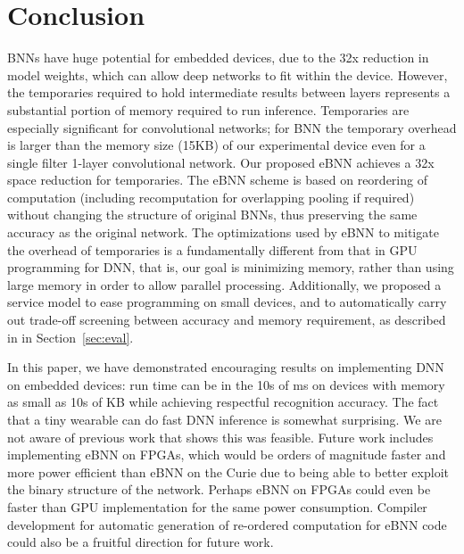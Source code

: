 \documentclass[10pt,emptycopyrightspace]{ewsn-proc}
\begin{document}



\section{Conclusion}
\label{sec:conclusion}
BNNs have huge potential for embedded devices, due to the 32x reduction in model weights, which can allow deep networks to fit within the device. However, the temporaries required to hold intermediate results between layers represents a substantial portion of memory required to run inference. Temporaries are especially significant for convolutional networks; for BNN the temporary overhead is larger than the memory size (15KB) of our experimental device even for a single filter 1-layer convolutional network. Our proposed eBNN achieves a 32x space reduction for temporaries. The eBNN scheme is based on reordering of computation (including recomputation for overlapping pooling if required) without changing the structure of original BNNs, thus preserving the same accuracy as the original network. The optimizations used by eBNN to mitigate the overhead of temporaries is a fundamentally different from that in GPU programming for DNN, that is, our goal is minimizing memory, rather than using large memory in order to allow parallel processing. Additionally, we proposed a service model to ease programming on small devices, and to automatically carry out trade-off screening between accuracy and memory requirement, as described in in Section~\ref{sec:eval}.

In this paper, we have demonstrated encouraging results on implementing DNN on embedded devices: run time can be in the 10s of ms on devices with memory as small as 10s of KB while achieving respectful recognition accuracy. The fact that a tiny wearable can do fast DNN inference is somewhat surprising. We are not aware of previous work that shows this was feasible. Future work includes implementing eBNN on FPGAs, which would be orders of magnitude faster and more power efficient than eBNN on the Curie due to being able to better exploit the binary structure of the network. Perhaps eBNN on FPGAs could even be faster than GPU implementation for the same power consumption. Compiler development for automatic generation of re-ordered computation for eBNN code could also be a fruitful direction for future work.
\end{document}
